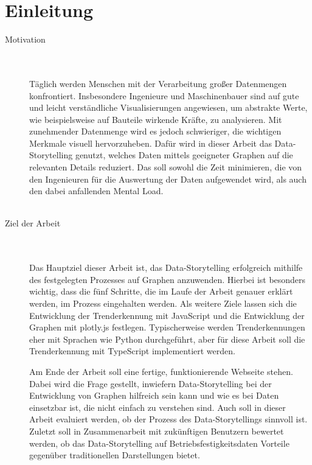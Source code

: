 \chapter{Einleitung}
\begin{description}
\item[Motivation] \hfill \\\\
Täglich werden Menschen mit der Verarbeitung großer Datenmengen konfrontiert. Insbesondere Ingenieure und Maschinenbauer sind auf gute und leicht verständliche Visualisierungen angewiesen, um abstrakte Werte, wie beispielsweise auf Bauteile wirkende Kräfte, zu analysieren. Mit zunehmender Datenmenge wird es jedoch schwieriger, die wichtigen Merkmale visuell hervorzuheben. Dafür wird in dieser Arbeit das Data-Storytelling genutzt, welches Daten mittels geeigneter Graphen auf die relevanten Details reduziert. Das soll sowohl die Zeit minimieren, die von den Ingenieuren für die Auswertung der Daten aufgewendet wird, als auch den dabei anfallenden Mental Load.\\\\

\item[Ziel der Arbeit]\hfill \\\\
Das Hauptziel dieser Arbeit ist, das Data-Storytelling erfolgreich mithilfe des festgelegten Prozesses auf Graphen anzuwenden. Hierbei ist besonders wichtig, dass die fünf Schritte, die im Laufe der Arbeit genauer erklärt werden, im Prozess eingehalten werden. Als weitere Ziele lassen sich die Entwicklung der Trenderkennung mit JavaScript und die Entwicklung der Graphen mit plotly.js festlegen. Typischerweise werden Trenderkennungen eher mit Sprachen wie Python durchgeführt, aber für diese Arbeit soll die Trenderkennung mit TypeScript implementiert werden.

Am Ende der Arbeit soll eine fertige, funktionierende Webseite stehen. Dabei wird die Frage gestellt, inwiefern Data-Storytelling bei der Entwicklung von Graphen hilfreich sein kann und wie es bei Daten einsetzbar ist, die nicht einfach zu verstehen sind. Auch soll in dieser Arbeit evaluiert werden, ob der Prozess des Data-Storytellings sinnvoll ist. Zuletzt soll in Zusammenarbeit mit zukünftigen Benutzern bewertet werden, ob das Data-Storytelling auf Betriebsfestigkeitsdaten Vorteile gegenüber traditionellen Darstellungen bietet.\\\\


\end{description}
